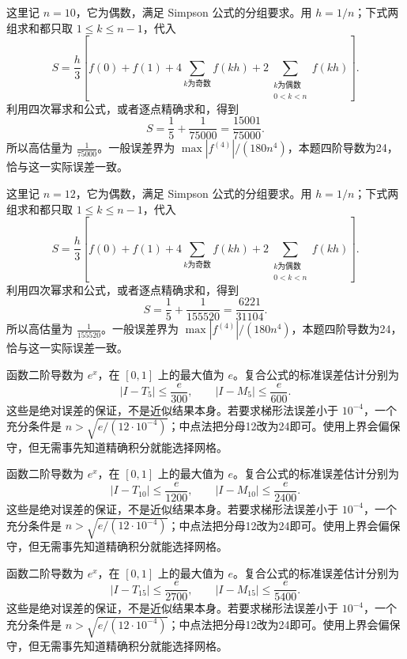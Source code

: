 \documentclass[UTF8,12pt,a4paper,fontset=fandol]{ctexart}
\begin{document}
\begin{solve}\label{ans:c18q11}
这里记 $n=10$，它为偶数，满足 Simpson 公式的分组要求。用 $h=1/n$；下式两组求和都只取 $1\le k\le n-1$，代入
\[
S=\frac h3\left[f(0)+f(1)+4\sum_{k\text{为奇数}}f(kh)+2\sum_{\substack{k\text{为偶数}\\0<k<n}}f(kh)\right].
\]
利用四次幂求和公式，或者逐点精确求和，得到
\[
S=\frac15+\frac{1}{75000}=\frac{15001}{75000}.
\]
所以高估量为 $\frac{1}{75000}$。一般误差界为 $\max|f^{(4)}|/(180n^4)$，本题四阶导数为24，恰与这一实际误差一致。
\end{solve}

\begin{solve}\label{ans:c18q12}
这里记 $n=12$，它为偶数，满足 Simpson 公式的分组要求。用 $h=1/n$；下式两组求和都只取 $1\le k\le n-1$，代入
\[
S=\frac h3\left[f(0)+f(1)+4\sum_{k\text{为奇数}}f(kh)+2\sum_{\substack{k\text{为偶数}\\0<k<n}}f(kh)\right].
\]
利用四次幂求和公式，或者逐点精确求和，得到
\[
S=\frac15+\frac{1}{155520}=\frac{6221}{31104}.
\]
所以高估量为 $\frac{1}{155520}$。一般误差界为 $\max|f^{(4)}|/(180n^4)$，本题四阶导数为24，恰与这一实际误差一致。
\end{solve}

\begin{solve}\label{ans:c18q13}
函数二阶导数为 $e^x$，在 $[0,1]$ 上的最大值为 $e$。复合公式的标准误差估计分别为
\[
|I-T_{5}|\le\frac e{300},\qquad |I-M_{5}|\le\frac e{600}.
\]
这些是绝对误差的保证，不是近似结果本身。若要求梯形法误差小于 $10^{-4}$，一个充分条件是 $n>\sqrt{e/(12\cdot10^{-4})}$；中点法把分母12改为24即可。使用上界会偏保守，但无需事先知道精确积分就能选择网格。
\end{solve}

\begin{solve}\label{ans:c18q14}
函数二阶导数为 $e^x$，在 $[0,1]$ 上的最大值为 $e$。复合公式的标准误差估计分别为
\[
|I-T_{10}|\le\frac e{1200},\qquad |I-M_{10}|\le\frac e{2400}.
\]
这些是绝对误差的保证，不是近似结果本身。若要求梯形法误差小于 $10^{-4}$，一个充分条件是 $n>\sqrt{e/(12\cdot10^{-4})}$；中点法把分母12改为24即可。使用上界会偏保守，但无需事先知道精确积分就能选择网格。
\end{solve}

\begin{solve}\label{ans:c18q15}
函数二阶导数为 $e^x$，在 $[0,1]$ 上的最大值为 $e$。复合公式的标准误差估计分别为
\[
|I-T_{15}|\le\frac e{2700},\qquad |I-M_{15}|\le\frac e{5400}.
\]
这些是绝对误差的保证，不是近似结果本身。若要求梯形法误差小于 $10^{-4}$，一个充分条件是 $n>\sqrt{e/(12\cdot10^{-4})}$；中点法把分母12改为24即可。使用上界会偏保守，但无需事先知道精确积分就能选择网格。
\end{solve}
\end{document}
